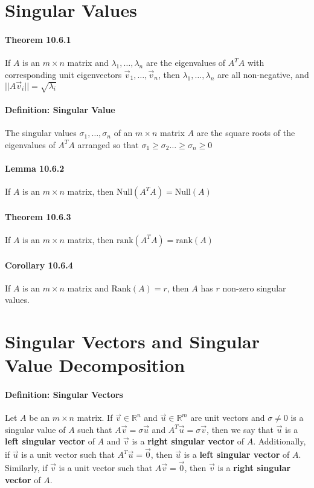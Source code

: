 \documentclass[10pt,letter]{article}
\begin{document}
\section*{Singular Values}
\paragraph{Theorem 10.6.1}
If $A$ is an $m\times n$ matrix and $\lambda_1,\ldots,\lambda_n$ are the eigenvalues of $A^TA$ with corresponding unit eigenvectors $\vec{v}_1,\ldots,\vec{v}_n$, then $\lambda_1,\ldots,\lambda_n$ are all non-negative, and $||A\vec{v}_i||=\sqrt{\lambda_i}$
\paragraph{Definition: Singular Value}
The singular values $\sigma_1,\ldots,\sigma_n$ of an $m\times n$ matrix $A$ are the square roots of the eigenvalues of $A^TA$ arranged so that $\sigma_1\geq\sigma_2\ldots\geq\sigma_n\geq0$
\paragraph{Lemma 10.6.2}
If $A$ is an $m\times n$ matrix, then $\text{Null}(A^TA)=\text{Null}(A)$
\paragraph{Theorem 10.6.3}
If $A$ is an $m\times n$ matrix, then $\text{rank}(A^TA)=\text{rank}(A)$
\paragraph{Corollary 10.6.4}
If $A$ is an $m\times n$ matrix and $\text{Rank}(A)=r$, then $A$ has $r$ non-zero singular values.


\section*{Singular Vectors and Singular Value Decomposition}
\paragraph{Definition: Singular Vectors}
Let $A$ be an $m\times n$ matrix. If $\vec{v}\in\mathbb{R}^n$ and $\vec{u}\in\mathbb{R}^m$ are unit vectors and $\sigma\neq0$ is a singular value of $A$ such that $A\vec{v}=\sigma\vec{u}$ and $A^T\vec{u}=\sigma\vec{v}$, then we say that $\vec{u}$ is a \textbf{left singular vector} of $A$ and $\vec{v}$ is a \textbf{right singular vector} of $A$. Additionally, if $\vec{u}$ is a unit vector such that $A^T\vec{u}=\vec{0}$, then $\vec{u}$ is a \textbf{left singular vector} of $A$. Similarly, if $\vec{v}$ is a unit vector such that $A\vec{v}=\vec{0}$, then $\vec{v}$ is a \textbf{right singular vector} of $A$. 
\end{document}
